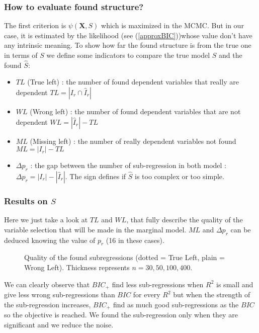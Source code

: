 \documentclass[11pt,a4paper]{article}
\begin{document}
		\subsubsection{How to evaluate found structure?}
			The first criterion is $\psi(\boldsymbol{X},S)$ which is maximized in the MCMC. But in our case, it is estimated by the likelihood (see (\ref{approxBIC}))whose value don't have any intrinsic meaning. To show how far the found structure is from the true one in terms of $S$ we define some indicators to compare the true model $S$ and the found $\hat{S}$:
			\begin{itemize}
				\item $TL$ (True left) : the number of found dependent variables that really are dependent $TL=|I_r\cap \hat{I}_r|$ 
				\item $WL$ (Wrong left) : the number of found dependent variables that are not dependent $WL=|\hat{I}_r|-TL$
				\item $ML$ (Missing left) : the number of really dependent variables not found $ML=|I_r|-TL$
				\item $\Delta p_r$ : the gap between the number of sub-regression in both model : $\Delta p_r=|I_r|-|\hat{I}_r|$. The sign defines if $\hat{S}$ is too complex or too simple.
			\end{itemize}
			
		\subsubsection{Results on $S$}	\label{compZ}
Here we just take a look at $TL$ and $WL$, that fully describe the quality of the variable selection that will be made in the marginal model. $ML$ and $\Delta p_r$ can be deduced knowing the value of $p_r$ (16 in these cases).
\begin{figure}[h!]
	 \quad
	\caption{Quality of the found subregressions (dotted = True Left, plain = Wrong Left). Thickness represents $n=30,50,100,400$.}\label{reshatZ}
\end{figure}

We can clearly observe that $BIC_+$ find less sub-regressions when $R^2$ is small and give less wrong sub-regressions than $BIC$ for every $R^2$ but when the strength of the sub-regression increases, $BIC_+$ find as much good sub-regressions as the $BIC$ so the objective is reached. We found the sub-regression only when they are significant and we reduce the noise.
\end{document}

